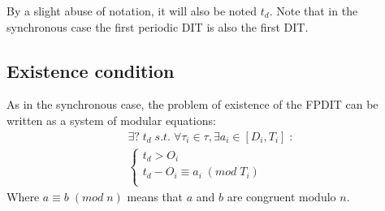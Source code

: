 \documentclass[conference]{IEEEtran}
\begin{document}
    By a slight abuse of notation, it will also be noted $t_d$. Note that in the
    synchronous case the first periodic DIT is also the first DIT.

	\subsection{Existence condition}
	\label{sct:FPDITexist}
		As in the synchronous case, the problem of existence of the FPDIT
		can be written as a system of modular equations:
		\begin{equation}
			\begin{array}{l}
				\exists ? \; t_d \; s.t. \; \forall \tau_i \in \tau, \exists a_i \in [D_i,
				T_i] \; :\\
				\left\{
					\begin{array}{l}
						t_d > O_i \\
						t_d - O_i \equiv a_i \; (mod \;	T_i)
						\\
					\end{array}
				\right.
			\end{array}
		\end{equation}
        Where $a \equiv b \; (mod \; n)$ means that $a$ and $b$ are congruent modulo $n$.
\end{document}
